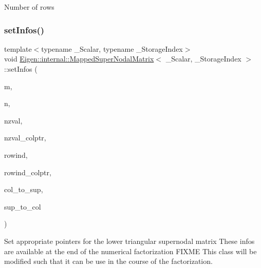 Number of rows \mbox{\label{class_eigen_1_1internal_1_1_mapped_super_nodal_matrix_af1427486564e2c75b9da68f98bd04e63}} 
\subsubsection{\texorpdfstring{setInfos()}{setInfos()}}
{\footnotesize\ttfamily template$<$typename \+\_\+\+Scalar, typename \+\_\+\+Storage\+Index$>$ \\
void \mbox{\hyperlink{class_eigen_1_1internal_1_1_mapped_super_nodal_matrix}{Eigen\+::internal\+::\+Mapped\+Super\+Nodal\+Matrix}}$<$ \+\_\+\+Scalar, \+\_\+\+Storage\+Index $>$\+::set\+Infos (\begin{DoxyParamCaption}\item[{Index}]{m,  }\item[{Index}]{n,  }\item[{\mbox{\hyperlink{class_eigen_1_1_matrix}{Scalar\+Vector}} \&}]{nzval,  }\item[{\mbox{\hyperlink{class_eigen_1_1_matrix}{Index\+Vector}} \&}]{nzval\+\_\+colptr,  }\item[{\mbox{\hyperlink{class_eigen_1_1_matrix}{Index\+Vector}} \&}]{rowind,  }\item[{\mbox{\hyperlink{class_eigen_1_1_matrix}{Index\+Vector}} \&}]{rowind\+\_\+colptr,  }\item[{\mbox{\hyperlink{class_eigen_1_1_matrix}{Index\+Vector}} \&}]{col\+\_\+to\+\_\+sup,  }\item[{\mbox{\hyperlink{class_eigen_1_1_matrix}{Index\+Vector}} \&}]{sup\+\_\+to\+\_\+col }\end{DoxyParamCaption})\hspace{0.3cm}{\ttfamily [inline]}}

Set appropriate pointers for the lower triangular supernodal matrix These infos are available at the end of the numerical factorization F\+I\+X\+ME This class will be modified such that it can be use in the course of the factorization. \mbox{\label{class_eigen_1_1internal_1_1_mapped_super_nodal_matrix_ab93581127fd87b6bc467b6f67fcf4eeb}} 
